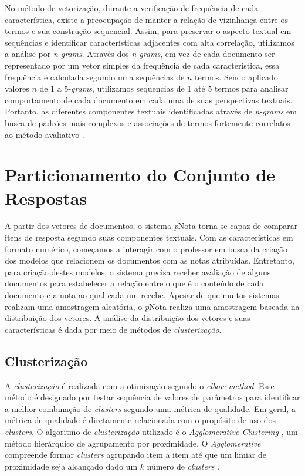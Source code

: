No método de vetorização, durante a verificação de frequência de cada característica, existe a preocupação de manter a relação de vizinhança entre os termos e sua construção sequencial. Assim, para preservar o aspecto textual em sequências e identificar características adjacentes com alta correlação, utilizamos a análise por \textit{n-grams}. Através dos \textit{n-grams}, em vez de cada documento ser representado por um vetor simples da frequência de cada característica, essa frequência é calculada segundo uma sequências de $ n $ termos. Sendo aplicado valores $ n $ de 1 a 5-\textit{grams}, utilizamos sequencias de 1 até 5 termos para analisar comportamento de cada documento em cada uma de suas perspectivas textuais. Portanto, as diferentes componentes textuais identificadas através de \textit{n-grams} em busca de padrões mais complexos e associações de termos fortemente correlatos ao método avaliativo \cite{spalenza2020}.

\section{Particionamento do Conjunto de Respostas}
\label{sec-amostragem}

A partir dos vetores de documentos, o sistema \textit{p}Nota torna-se capaz de comparar itens de resposta segundo suas componentes textuais. Com as características em formato numérico, começamos a interagir com o professor em busca da criação dos modelos que relacionem os documentos com as notas atribuídas. Entretanto, para criação destes modelos, o sistema precisa receber avaliação de alguns documentos para estabelecer a relação entre o que é o conteúdo de cada documento e a nota ao qual cada um recebe. Apesar de que muitos sistemas realizam uma amostragem aleatória, o \textit{p}Nota realiza uma amostragem baseada na distribuição dos vetores. A análise da distribuição dos vetores e suas características é dada por meio de métodos de \textit{clusterização}.

\subsection{Clusterização}
\label{subsec-clusterizacao}

A \textit{clusterização} é realizada com a otimização segundo o \textit{elbow method}. Esse método é designado por testar sequência de valores de parâmetros para identificar a melhor combinação de \textit{clusters} segundo uma métrica de qualidade. Em geral, a métrica de qualidade é diretamente relacionada com o propósito de uso dos \textit{clusters}. O algoritmo de \textit{clusterização} utilizado é o \textit{Agglomerative Clustering} \cite{spalenza2019}, um método hierárquico de agrupamento por proximidade. O \textit{Agglomerative} compreende formar \textit{clusters} agrupando item a item até que um limiar de proximidade seja alcançado dado um $ k $ número de \textit{clusters} \cite{everitt2011}.


